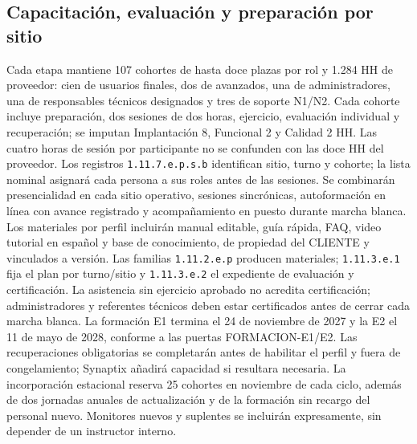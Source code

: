 \subsection{Capacitación, evaluación y preparación por sitio}
Cada etapa mantiene 107 cohortes de hasta doce plazas por rol y 1.284 HH de proveedor: cien de usuarios finales, dos de avanzados, una de administradores, una de responsables técnicos designados y tres de soporte N1/N2. Cada cohorte incluye preparación, dos sesiones de dos horas, ejercicio, evaluación individual y recuperación; se imputan Implantación 8, Funcional 2 y Calidad 2 HH. Las cuatro horas de sesión por participante no se confunden con las doce HH del proveedor. Los registros \texttt{1.11.7.e.p.s.b} identifican sitio, turno y cohorte; la lista nominal asignará cada persona a sus roles antes de las sesiones.
Se combinarán presencialidad en cada sitio operativo, sesiones sincrónicas, autoformación en línea con avance registrado y acompañamiento en puesto durante marcha blanca. Los materiales por perfil incluirán manual editable, guía rápida, FAQ, video tutorial en español y base de conocimiento, de propiedad del CLIENTE y vinculados a versión. Las familias \texttt{1.11.2.e.p} producen materiales; \texttt{1.11.3.e.1} fija el plan por turno/sitio y \texttt{1.11.3.e.2} el expediente de evaluación y certificación. La asistencia sin ejercicio aprobado no acredita certificación; administradores y referentes técnicos deben estar certificados antes de cerrar cada marcha blanca.
La formación E1 termina el 24 de noviembre de 2027 y la E2 el 11 de mayo de 2028, conforme a las puertas FORMACION-E1/E2. Las recuperaciones obligatorias se completarán antes de habilitar el perfil y fuera de congelamiento; Synaptix añadirá capacidad si resultara necesaria. La incorporación estacional reserva 25 cohortes en noviembre de cada ciclo, además de dos jornadas anuales de actualización y de la formación sin recargo del personal nuevo. Monitores nuevos y suplentes se incluirán expresamente, sin depender de un instructor interno.~\parencite[arts.~89--90; p.~45]{bases-admin}~\parencite[RT-22.01--06; p.~38]{bases-transversales}

